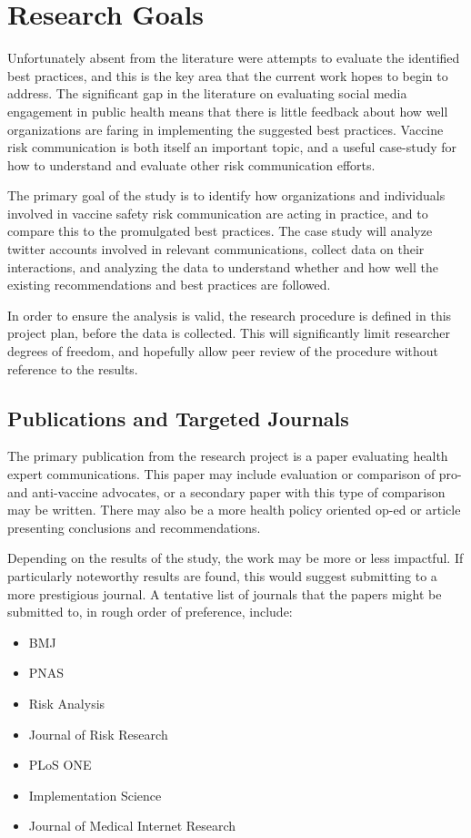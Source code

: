 \documentclass{article}
\begin{document}
\section{Research Goals}

Unfortunately absent from the literature were attempts to evaluate the identified best practices, and this is the key area that the current work hopes to begin to address. The significant gap in the literature on evaluating social media engagement in public health means that there is little feedback about how well organizations are faring in implementing the suggested best practices. Vaccine risk communication is both itself an important topic, and a useful case-study for how to understand and evaluate other risk communication efforts.

The primary goal of the study is to identify how organizations and individuals involved in vaccine safety risk communication are acting in practice, and to compare this to the promulgated best practices. The case study will analyze twitter accounts involved in relevant communications, collect data on their interactions, and analyzing the data to understand whether and how well the existing recommendations and best practices are followed. 

In order to ensure the analysis is valid, the research procedure is defined in this project plan, before the data is collected. This will significantly limit researcher degrees of freedom, and hopefully allow peer review of the procedure without reference to the results. %

\subsection{Publications and Targeted Journals}
The primary publication from the research project is a paper evaluating health expert communications. This paper may include evaluation or comparison of pro- and anti-vaccine advocates, or a secondary paper with this type of comparison may be written. There may also be a more health policy oriented op-ed or article presenting conclusions and recommendations.

Depending on the results of the study, the work may be more or less impactful. If particularly noteworthy results are found, this would suggest submitting to a more prestigious journal. A tentative list of journals that the papers might be submitted to, in rough order of preference, include:
\begin{itemize}
\item BMJ
\item PNAS
\item Risk Analysis 
\item Journal of Risk Research
\item PLoS ONE
\item Implementation Science
\item Journal of Medical Internet Research
\end{itemize}
\end{document}

